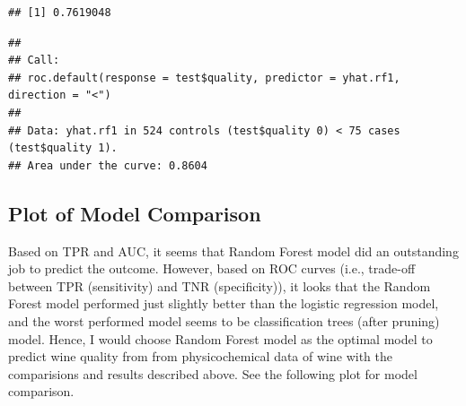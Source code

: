 \documentclass[
  english,
  man]{apa6}
\begin{document}
\begin{verbatim}
## [1] 0.7619048
\end{verbatim}

\begin{verbatim}
## 
## Call:
## roc.default(response = test$quality, predictor = yhat.rf1, direction = "<")
## 
## Data: yhat.rf1 in 524 controls (test$quality 0) < 75 cases (test$quality 1).
## Area under the curve: 0.8604
\end{verbatim}

\hypertarget{plot-of-model-comparison}{%
\subsection{Plot of Model Comparison}\label{plot-of-model-comparison}}

Based on TPR and AUC, it seems that Random Forest model did an outstanding job to predict the outcome. However, based on ROC curves (i.e., trade-off between TPR (sensitivity) and TNR (specificity)), it looks that the Random Forest model performed just slightly better than the logistic regression model, and the worst performed model seems to be classification trees (after pruning) model. Hence, I would choose Random Forest model as the optimal model to predict wine quality from from physicochemical data of wine with the comparisions and results described above.
See the following plot for model comparison.
\end{document}
